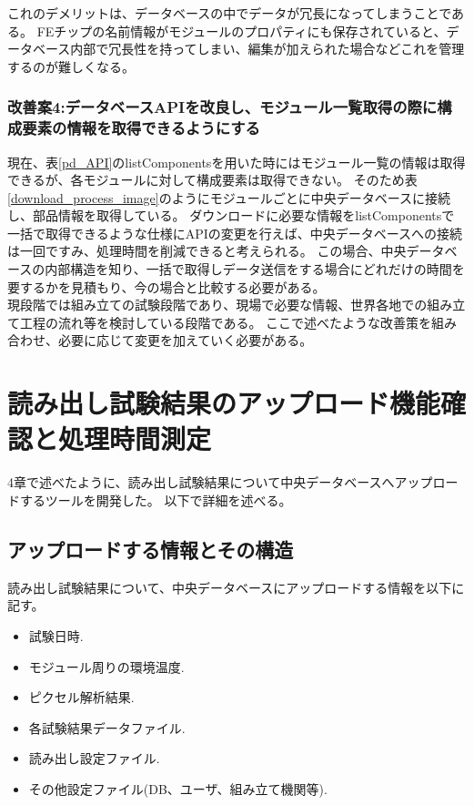 これのデメリットは、データベースの中でデータが冗長になってしまうことである。
FEチップの名前情報がモジュールのプロパティにも保存されていると、データベース内部で冗長性を持ってしまい、編集が加えられた場合などこれを管理するのが難しくなる。

\subsubsection{改善案4:データベースAPIを改良し、モジュール一覧取得の際に構成要素の情報を取得できるようにする}
現在、表\ref{pd_API}のlistComponentsを用いた時にはモジュール一覧の情報は取得できるが、各モジュールに対して構成要素は取得できない。
そのため表\ref{download_process_image}のようにモジュールごとに中央データベースに接続し、部品情報を取得している。
ダウンロードに必要な情報をlistComponentsで一括で取得できるような仕様にAPIの変更を行えば、中央データベースへの接続は一回ですみ、処理時間を削減できると考えられる。
この場合、中央データベースの内部構造を知り、一括で取得しデータ送信をする場合にどれだけの時間を要するかを見積もり、今の場合と比較する必要がある。\\



現段階では組み立ての試験段階であり、現場で必要な情報、世界各地での組み立て工程の流れ等を検討している段階である。
ここで述べたような改善策を組み合わせ、必要に応じて変更を加えていく必要がある。


\newpage

\section{読み出し試験結果のアップロード機能確認と処理時間測定}
4章で述べたように、読み出し試験結果について中央データベースへアップロードするツールを開発した。
以下で詳細を述べる。
\subsection{アップロードする情報とその構造}
読み出し試験結果について、中央データベースにアップロードする情報を以下に記す。
\begin{itemize}
  \item 試験日時.
  \item モジュール周りの環境温度.
  \item ピクセル解析結果.
  \item 各試験結果データファイル.
  \item 読み出し設定ファイル.
  \item その他設定ファイル(DB、ユーザ、組み立て機関等).
\end{itemize}

